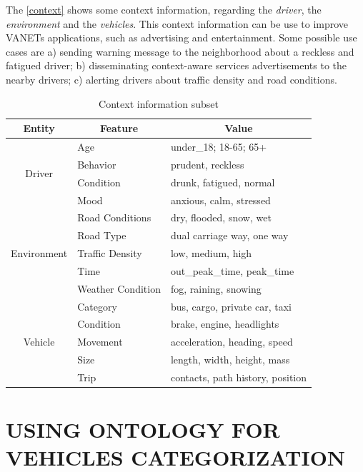 \documentclass[letterpaper, 10 pt, conference]{ieeeconf}  %
\begin{document}
The \autoref{context} shows some context information, regarding the \emph{driver}, the \emph{environment} and the \emph{vehicles}. This context information can be use to improve VANETs applications, such as advertising and entertainment. Some possible use cases are a) sending warning message to the neighborhood about a reckless and fatigued driver; b) disseminating context-aware services advertisements to the nearby drivers; c) alerting drivers about traffic density and road conditions.

\begin{table}[ht]
    \center
    \caption{Context information subset} \label{context}
    \begin{tabular}{|c|l|l|}
        \hline
        Entity & \multicolumn{1}{c|}{Feature} & \multicolumn{1}{c|}{Value} \\ \hline
        \multirow{4}{*}{Driver} & Age & under\_18; 18-65; 65+ \\ \cline{2-3}
        & Behavior & prudent, reckless \\ \cline{2-3}
        & Condition& drunk, fatigued, normal \\ \cline{2-3}
        & Mood & anxious, calm, stressed \\ \hline
        \multirow{5}{*}{Environment} & Road Conditions& dry, flooded, snow, wet \\ \cline{2-3}
        & Road Type& dual carriage way, one way \\ \cline{2-3}
        & Traffic Density& low, medium, high \\ \cline{2-3}
        & Time & out\_peak\_time, peak\_time \\ \cline{2-3}
        & Weather Condition& fog, raining, snowing \\ \hline
        \multirow{5}{*}{Vehicle} & Category & bus, cargo, private car, taxi \\ \cline{2-3}
        & Condition& brake, engine, headlights \\ \cline{2-3}
        & Movement & acceleration, heading, speed \\ \cline{2-3}
        & Size & length, width, height, mass \\ \cline{2-3}
        & Trip & contacts, path history, position \\ \hline
    \end{tabular}
\end{table}

\section{USING ONTOLOGY FOR VEHICLES CATEGORIZATION}
\end{document}
